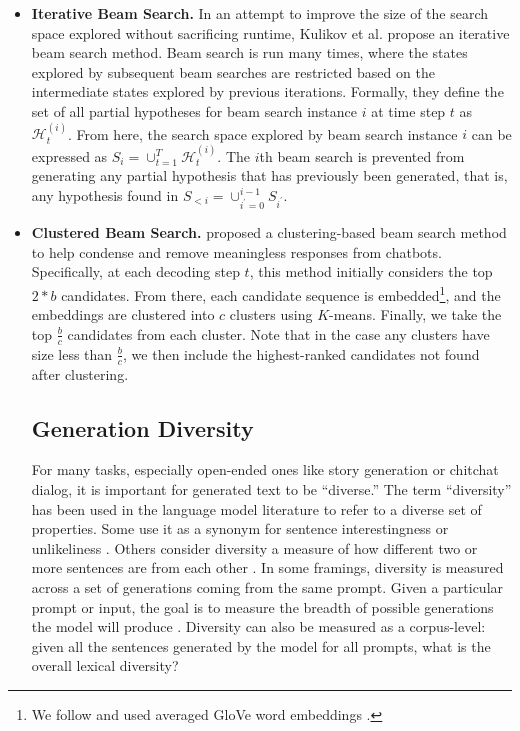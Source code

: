 \begin{itemize}
\item \textbf{Iterative Beam Search.}\quad
In an attempt to improve the size of the search space explored without sacrificing runtime, Kulikov et al. \citep{kulikov2018importance} propose an iterative beam search method.
Beam search is run many times, where the states explored by subsequent beam searches are restricted based on the intermediate states explored by previous iterations.
Formally, they define the set of all partial hypotheses for beam search instance $i$ at time step $t$ as $\mathcal{H}_t^{(i)}$. From here, the search space explored by beam search instance $i$ can be expressed as $S_i = \cup_{t=1}^T \mathcal{H}_t^{(i)}$.
The $i$th beam search is prevented from generating any partial hypothesis that has previously been generated, that is, any hypothesis found in $S_{<i} = \cup_{i^{\prime}=0}^{i-1}S_{i^{\prime}}$.

\item \textbf{Clustered Beam Search.}\quad
\citet{tam2019clustered} proposed a clustering-based beam search method to help condense and remove meaningless responses from chatbots.
Specifically, at each decoding step $t$, this method initially considers the top $2*b$ candidates. From there, each candidate sequence is embedded\footnote{We follow \citet{tam2019clustered} and used averaged GloVe word embeddings \cite{pennington2014glove}.}, and the embeddings are clustered into $c$ clusters using $K$-means. Finally, we take the top $\frac{b}{c}$ candidates from each cluster. Note that in the case any clusters have size less than $\frac{b}{c}$, we then include the highest-ranked candidates not found after clustering.

\subsection{Generation Diversity}
For many tasks, especially open-ended ones like story generation or chitchat dialog, it is important for generated text to be ``diverse.''
The term ``diversity'' has been used in the language model literature to refer to a diverse set of properties.
Some use it as a synonym for sentence interestingness or unlikeliness \citep{tatsunori2019unifying}.
Others consider diversity a measure of how different two or more sentences are from each other \citep{vijayakumar2016diverse,gimpel2013systematic}.
In some framings, diversity is measured across a set of generations coming from the same prompt.
Given a particular prompt or input, the goal is to measure the breadth of possible generations the model will produce \citep{mayhew2020simultaneous}.
Diversity can also be measured as a corpus-level: given all the sentences generated by the model for all prompts, what is the overall lexical diversity?


\end{itemize}
